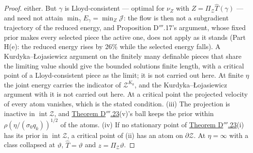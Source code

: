 \begin{proof}
either. But $\gamma$ is Lloyd-consistent --- optimal for $\nu_Z$ with $Z = \Pi_{\mathcal{Z}}\hat T(\gamma)$ --- and
need not attain $\min_\gamma E_\gamma = \min_Z\mathcal{J}$: the flow is then not a subgradient trajectory of the
reduced energy, and Proposition D$'''$.17's argument, whose fixed prior makes every selected piece the active one,
does not apply as it stands (Part H(e): the reduced energy rises by 26\% while the selected energy falls). A
Kurdyka--{\L}ojasiewicz argument on the finitely many definable pieces that share the limiting value should give the
bounded solutions finite length, with a critical point of a Lloyd-consistent piece as the limit; it is not carried out
here. At finite $\eta$ the joint energy carries the indicator of $\mathcal{Z}^{K_0}$, and the Kurdyka--{\L}ojasiewicz
argument with it is not carried out here. At a critical point the projected velocity of every atom vanishes, which is
the stated condition. (iii) The projection is inactive in $\operatorname{int}\mathcal{Z}$, and
\hyperref[res:thmDppp:23]{Theorem D$'''$.23}(v)'s ball keeps the prior within $\rho(\eta/(\sigma_0q_k))^{1/2}$ of the
atoms. (iv) If no stationary point of \hyperref[res:thmDppp:23]{Theorem D$'''$.23}(i) has its prior in
$\operatorname{int}\mathcal{Z}$, a critical point of (ii) has an atom on $\partial\mathcal{Z}$. At $\eta = \infty$
with a class collapsed at $\vartheta$, $\hat T = \vartheta$ and $z = \Pi_{\mathcal{Z}}\vartheta$.
\end{proof}
